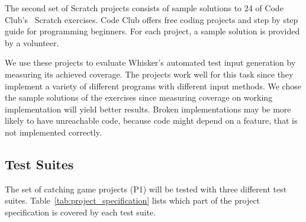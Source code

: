 The second set of Scratch projects consists of sample solutions to 24 of Code Club's~\cite{codeclub} Scratch exercises.
Code Club offers free coding projects and step by step guide for programming beginners.
For each project, a sample solution is provided by a volunteer.
\parspace

We use these projects to evaluate Whisker's automated test input generation by measuring its achieved coverage.
The projects work well for this task since they implement a variety of different programs with different input methods.
We chose the sample solutions of the exercises since measuring coverage on working implementation will yield better results.
Broken implementations may be more likely to have unreachable code,
because code might depend on a feature, that is not implemented correctly.

\subsection{Test Suites}

The set of catching game projects (P1) will be tested with three different test suites.
Table~\ref{tab:project_specification} lists which part of the project specification is covered by each test suite.

